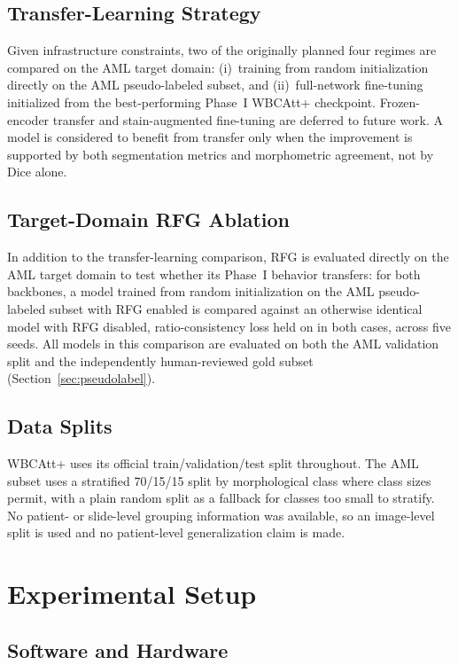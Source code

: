 \documentclass[pdflatex,sn-mathphys-num]{sn-jnl}%
\theoremstyle{thmstyleone}%
\theoremstyle{thmstyletwo}%
\theoremstyle{thmstylethree}%
\begin{document}
\subsection{Transfer-Learning Strategy}

Given infrastructure constraints, two of the originally planned four regimes are compared on the AML target domain: (i)~training from random initialization directly on the AML pseudo-labeled subset, and (ii)~full-network fine-tuning initialized from the best-performing Phase~I WBCAtt+ checkpoint. Frozen-encoder transfer and stain-augmented fine-tuning are deferred to future work. A model is considered to benefit from transfer only when the improvement is supported by both segmentation metrics and morphometric agreement, not by Dice alone.

\subsection{Target-Domain RFG Ablation}

In addition to the transfer-learning comparison, RFG is evaluated directly on the AML target domain to test whether its Phase~I behavior transfers: for both backbones, a model trained from random initialization on the AML pseudo-labeled subset with RFG enabled is compared against an otherwise identical model with RFG disabled, ratio-consistency loss held on in both cases, across five seeds. All models in this comparison are evaluated on both the AML validation split and the independently human-reviewed gold subset (Section~\ref{sec:pseudolabel}).

\subsection{Data Splits}
 
WBCAtt+ uses its official train/validation/test split throughout. The AML subset uses a stratified 70/15/15 split by morphological class where class sizes permit, with a plain random split as a fallback for classes too small to stratify. No patient- or slide-level grouping information was available, so an image-level split is used and no patient-level generalization claim is made.

\section{Experimental Setup}\label{sec:4}

\subsection{Software and Hardware}
\end{document}
